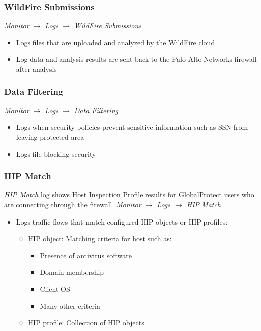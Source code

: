 \subsubsection{WildFire Submissions}
\textit{Monitor $\rightarrow$ Logs $\rightarrow$ WildFire Submissions}
\begin{itemize}
    \item Logs files that are uploaded and analyzed by the WildFire cloud
    \item Log data and analysis results are sent back to the Palo Alto Networks firewall after analysis
\end{itemize}

\subsubsection{Data Filtering}
\textit{Monitor $\rightarrow$ Logs $\rightarrow$ Data Filtering}
\begin{itemize}
    \item Logs when security policies prevent sensitive information such as SSN from leaving protected area
    \item Logs file-blocking security
\end{itemize}

\subsubsection{HIP Match}
\textit{HIP Match} log shows Host Inspection Profile results for GlobalProtect users who are connecting through the firewall.
\textit{Monitor $\rightarrow$ Logs $\rightarrow$ HIP Match}
\begin{itemize}
    \item Logs traffic flows that match configured HIP objects or HIP profiles:
        \begin{itemize}
            \item HIP object: Matching criteria for host such as:
                \begin{itemize}
                    \item Presence of antivirus software
                    \item Domain membership
                    \item Client OS
                    \item Many other criteria
                \end{itemize}
            \item HIP profile: Collection of HIP objects
        \end{itemize}
\end{itemize}

